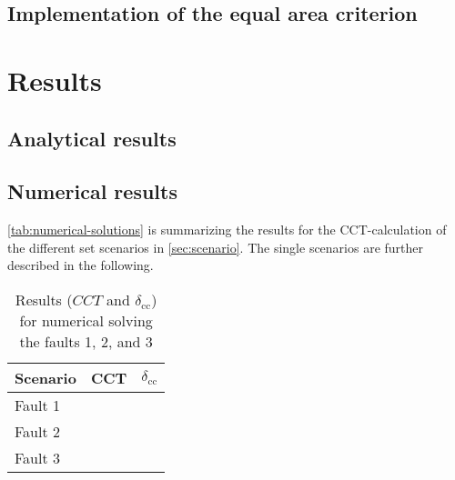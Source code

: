\section{Implementation of the equal area criterion}



\chapter{Results}
\label{chap:results}


\section{Analytical results}

\section{Numerical results}

\autoref{tab:numerical-solutions} is summarizing the results for the \acs{CCT}-calculation of the different set scenarios in \autoref{sec:scenario}. The single scenarios are further described in the following.

\begin{table}[!htb]
        \small
        \centering
        \caption[Numerical results for \acs{CCT}-calculations]{Results ($CCT$ and $\delta_\mathrm{cc}$) for numerical solving the faults 1, 2, and 3}
        \label{tab:numerical-solutions}
        \vspace{12pt}
        \begin{tabular}{|l|r|r|}
                \hline
                \rowcolor{lightgray} Scenario & \acs{CCT} & $\delta_\mathrm{cc}$ \\ \hline \hline
                Fault 1 & & \\ \hline
                Fault 2 & & \\ \hline
                Fault 3 & & \\ \hline         
        \end{tabular}
\end{table}

